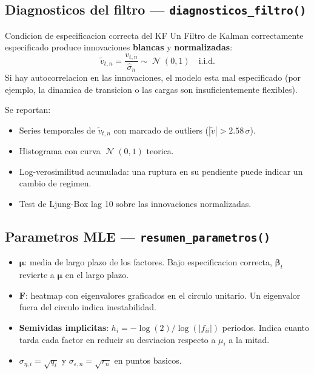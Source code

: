 \documentclass[12pt, a4paper]{article}
\theoremstyle{plain}
\theoremstyle{definition}
\theoremstyle{remark}
\newcommand{\bbet}{\bm{\beta}}
\newcommand{\bmu}{\bm{\mu}}
\newcommand{\bF}{\mathbf{F}}
\DeclareMathOperator{\N}{\mathcal{N}}
\begin{document}
\subsection{Diagnosticos del filtro --- \texttt{diagnosticos\_filtro()}}

\begin{teoremabox}{Condicion de especificacion correcta del KF}
Un Filtro de Kalman correctamente especificado produce innovaciones
\textbf{blancas} y \textbf{normalizadas}:
\begin{equation}
  \tilde{v}_{t,n} = \frac{v_{t,n}}{\hat{\sigma}_n} \sim \N(0,1) \quad \text{i.i.d.}
  \label{eq:white_innov}
\end{equation}
Si hay autocorrelacion en las innovaciones, el modelo esta mal especificado
(por ejemplo, la dinamica de transicion o las cargas son insuficientemente flexibles).
\end{teoremabox}

Se reportan:
\begin{itemize}[leftmargin=1.5em, itemsep=2pt]
  \item Series temporales de $\tilde{v}_{t,n}$ con marcado de outliers
        ($|\tilde{v}| > 2.58\,\sigma$).
  \item Histograma con curva $\N(0,1)$ teorica.
  \item Log-verosimilitud acumulada: una ruptura en su pendiente puede
        indicar un cambio de regimen.
  \item Test de Ljung-Box lag 10 sobre las innovaciones normalizadas.
\end{itemize}

\subsection{Parametros MLE --- \texttt{resumen\_parametros()}}

\begin{itemize}[leftmargin=1.5em, itemsep=2pt]
  \item $\bmu$: media de largo plazo de los factores. Bajo especificacion
        correcta, $\bbet_t$ revierte a $\bmu$ en el largo plazo.
  \item $\bF$: heatmap con eigenvalores graficados en el circulo unitario.
        Un eigenvalor fuera del circulo indica inestabilidad.
  \item \textbf{Semividas implicitas}: $h_i = -\log(2)/\log(|f_{ii}|)$ periodos.
        Indica cuanto tarda cada factor en reducir su desviacion respecto a $\mu_i$
        a la mitad.
  \item $\sigma_{\eta,i} = \sqrt{q_i}$ y $\sigma_{\varepsilon,n} = \sqrt{r_n}$
        en puntos basicos.
\end{itemize}
\end{document}
